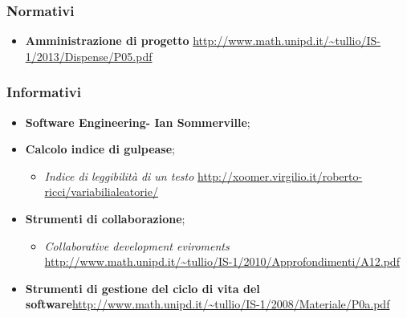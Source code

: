 \subsubsection{Normativi}
\begin{itemize}
	\item \textbf{Amministrazione di progetto} \url{http://www.math.unipd.it/~tullio/IS-1/2013/Dispense/P05.pdf} 
\end{itemize}
\subsubsection{Informativi}
\begin{itemize}
\item \textbf{Software Engineering- Ian Sommerville};
\item \textbf{Calcolo indice di gulpease};
	\begin{itemize} 
	\item \textit{Indice di leggibilità di un testo} \url{http://xoomer.virgilio.it/roberto-ricci/variabilialeatorie/}
	\end{itemize}
\item \textbf{Strumenti di collaborazione};
	\begin{itemize} 
	\item \textit{Collaborative development eviroments} \url{http://www.math.unipd.it/~tullio/IS-1/2010/Approfondimenti/A12.pdf}
	\end{itemize}
\item \textbf{Strumenti di gestione del ciclo di vita del software}\url{http://www.math.unipd.it/~tullio/IS-1/2008/Materiale/P0a.pdf}

\end{itemize}
